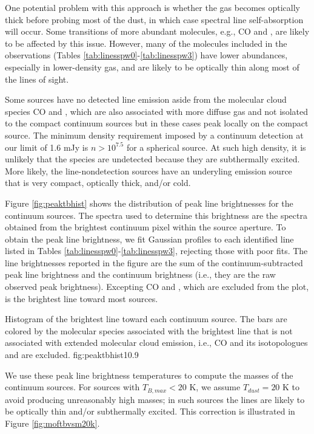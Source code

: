 \documentclass{emulateapj}
\begin{document}
One potential problem with this approach is whether the gas becomes optically thick
before probing most of the dust, in which case spectral line self-absorption
will occur.  Some transitions of more abundant molecules, e.g., CO and
\formaldehyde, are likely to be affected by this issue.  However, many of the
molecules included in the observations (Tables
\ref{tab:linesspw0}-\ref{tab:linesspw3}) have lower abundances, especially in
lower-density gas, and are likely to be optically thin along most of the lines
of sight.

Some sources have no detected line emission aside from the molecular cloud
species CO and \formaldehyde, which are also associated with more diffuse gas
and not isolated to the compact continuum sources but in these cases peak
locally on the compact source.  The minimum density requirement imposed by a
continuum detection at our limit of 1.6 mJy is $n>10^{7.5}$ \percc for a
spherical source.  At such high density, it is unlikely that the species are
undetected because they are subthermally excited.  More likely, the
line-nondetection sources have an underyling emission source that is very
compact, optically thick, and/or cold.

Figure \ref{fig:peaktbhist} shows the distribution of peak line brightnesses
for the continuum sources.  The spectra used to determine this brightness are
the spectra obtained from the brightest continuum pixel within the source
aperture.  To obtain the peak line brightness, we fit Gaussian profiles to each
identified line listed in Tables \ref{tab:linesspw0}-\ref{tab:linesspw3},
rejecting those with poor fits.  The line brightnesses reported in the figure
are the sum of the continuum-subtracted peak line brightness and the continuum
brightness (i.e., they are the raw observed peak brightness).  Excepting CO and
\formaldehyde, which are excluded from the plot, \methanol is the brightest
line toward most sources. 

{Histogram of the brightest line toward each continuum source.
The bars are colored by the molecular species associated with the brightest
line that is not associated with extended molecular cloud emission,
i.e., CO and its isotopologues and \formaldehyde are excluded.}
{fig:peaktbhist}{1}{0.9\textwidth}

We use these peak line brightness temperatures to compute the masses of the
continuum sources.  For sources with $T_{B,max} < 20$ K, we assume $T_{dust} =
20$ K to avoid producing unreasonably high masses; in such sources the lines
are likely to be optically thin and/or subthermally excited.  This correction is
illustrated in Figure \ref{fig:moftbvsm20k}.
\end{document}
